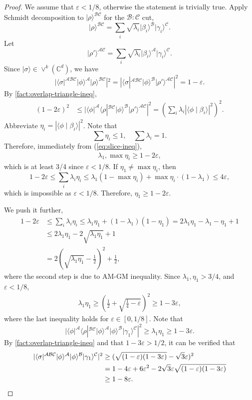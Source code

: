 \documentclass[10pt,a4paper]{article}
\theoremstyle{remark}
\def\epsilon{\varepsilon}
\newcommand{\C}{{\mathbb C}}
\newcommand{\cA}{\mathcal{A}}
\newcommand{\cB}{\mathcal{B}}
\newcommand{\cC}{\mathcal{C}}
\newcommand{\1}[1]{\mathds{1}{[#1]}}
\newcommand{\ket}[1]{\lvert #1\rangle}
\newcommand{\Symm}[2]{\vee^{#1}(\C^{#2})}
\newcommand{\bra}[1]{\langle#1|}
\numberwithin{equation}{section}
\begin{document}
\begin{proof}
We assume that $\epsilon<1/8$, otherwise the statement is trivially true.
Apply Schmidt decomposition to $\ket\rho^{\cB\cC}$ for the $\cB:\cC$ cut,
\[
    \ket\rho^{\cB\cC} = \sum_i \sqrt{\lambda_i} \ket{\beta_i}^\cB\ket{\gamma_i}^\cC.
\]
Let 
\[
    \ket{\rho'}^{\cA\cC}=\sum_i \sqrt{\lambda_i} \ket{\beta_i}^\cA\ket{\gamma_i}^\cC.
\]
Since $\ket\sigma\in\Symm{k}{d}$, we have
\[
    |
        \bra\sigma^{\cA\cB\cC} \ket\phi^\cA\ket\rho^{\cB\cC}|^2
    =
    |
        \bra\sigma^{\cA\cB\cC} \ket\phi^\cB\ket{\rho'}^{\cA\cC}
    |^2
    = 1- \epsilon.
\]
By \cref{fact:overlap-triangle-ineq},
\begin{align}
    (1-2\epsilon)^2
        &\le |\bra\phi^\cA\bra\rho^{\cB\cC} \ket\phi^\cB\ket{\rho'}^{\cA\cC}|^2
        = \left( \sum_i \lambda_i |\langle \phi\mid \beta_i \rangle|^2 \right)^2. \label{eq:slice-ineq}
\end{align}
Abbreviate $\eta_i = |\langle\phi\mid \beta_i \rangle|^2$. Note that
\[
    \sum \eta_i  \le 1, \quad \sum \lambda_i = 1.
\]
Therefore, immediately from (\ref{eq:slice-ineq}),  
\begin{align}
    \lambda_1, \max \eta_i \ge 1-2\epsilon,
\end{align}
which is at least 3/4 since $\epsilon<1/8$. If $\eta_1\not=\max\eta_i$, then 
\[
1-2\epsilon \le \sum_i \lambda_i \eta_i \le \lambda_1 (1-\max \eta_i) + \max \eta_i \cdot (1-\lambda_1) \le 4\epsilon,
\]
which is impossible as $\epsilon < 1/8$. Therefore, $\eta_1 \ge 1-2\epsilon$.

We push it further,
\begin{align}
    1-2\epsilon 
    &\le \sum_i \lambda_i \eta_i \le \lambda_1 \eta_1 + (1-\lambda_1)(1-\eta_1) = 2\lambda_1 \eta_1 -\lambda_1-\eta_1 +1
    \nonumber \\
    &\le 2\lambda_1\eta_1 -2\sqrt{\lambda_1\eta_1} +1
    \nonumber \\
    &=2 \left(\sqrt{\lambda_1 \eta_1 }-\frac{1}{2}\right)^2 + \frac{1}{2},
    \nonumber
\end{align}
where the second step is due to AM-GM inequality. Since $\lambda_1, \eta_1 > 3/4$, and $\epsilon<1/8$, 
\begin{align}
    \lambda_1\eta_1 \ge \left(\frac{1}{2}+\sqrt{\frac{1}{4}-\epsilon}\right)^2 \ge  1-3\epsilon,\nonumber
\end{align}
where the last inequality holds for $\epsilon\in[0,1/8]$. 
Note that
\[
 |\bra\phi^\cA\bra\rho^{\cB\cC} \ket\phi^\cA\ket\phi^\cB\ket{\gamma_1}^\cC|^2\ge\lambda_1\eta_1 \ge 1-3\epsilon.
\]
By \cref{fact:overlap-triangle-ineq} and that $1-3\epsilon > 1/2$, it can be verified that
\begin{align*}
    |\bra\sigma^{\cA\cB\cC} \ket\phi^\cA\ket\phi^\cB\ket{\gamma_1}^\cC|^2 
    &\ge (\sqrt{(1-\epsilon)(1-3\epsilon)}-\sqrt{3}\epsilon)^2
    \\
    &= 1-4\epsilon+6\epsilon^2 -2\sqrt{3}\epsilon\sqrt{(1-\epsilon)(1-3\epsilon)}
    \\
    &\ge 1-8\epsilon.\qedhere
\end{align*}
\end{proof}
\end{document}
